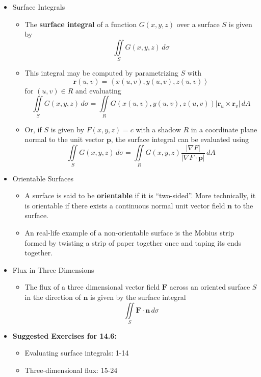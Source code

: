 \documentclass[12pt]{article}
\theoremstyle{plain}
\theoremstyle{definition}
\theoremstyle{remark}
\newcommand{\vect}[1]{\mathbf{#1}}
\begin{document}
	\begin{itemize}
		
	\item Surface Integrals
	
		\begin{itemize}
		\item The \textbf{surface integral} of a function $G(x,y,z)$ over a surface $S$ is given by \[\iint\limits_S G(x,y,z)\,d\sigma\]
		
		\item This integral may be computed by parametrizing $S$ with \[\vect{r}(u,v)=\left<x(u,v),y(u,v),z(u,v)\right>\] for $(u,v)\in R$ and evaluating \[\iint\limits_S G(x,y,z)\,d\sigma = \iint\limits_R G(x(u,v),y(u,v),z(u,v)) |\vect{r}_u\times \vect{r}_v|\,dA \]
		
		\item Or, if $S$ is given by $F(x,y,z)=c$ with a shadow $R$ in a coordinate plane normal to the unit vector $\vect{p}$, the surface integral can be evaluated using \[\iint\limits_S G(x,y,z)\,d\sigma = \iint\limits_R G(x,y,z)\frac{|\nabla F|}{|\nabla F \cdot \vect{p}|}\,dA\]
		\end{itemize}
		
	\item Orientable Surfaces
		\begin{itemize}
		\item A surface is said to be \textbf{orientable} if it is ``two-sided''. More technically, it is orientable if there exists a continuous normal unit vector field $\vect{n}$ to the surface.
		\item An real-life example of a non-orientable surface is the Mobius strip formed by twisting a strip of paper together once and taping its ends together.
		\end{itemize}
		
	\item Flux in Three Dimensions
	
		\begin{itemize}
		\item The flux of a three dimensional vector field $\vect{F}$ across an oriented surface $S$ in the direction of $\vect{n}$ is given by the surface integral \[\iint\limits_S \vect{F}\cdot\vect{n}\,d\sigma\]
		\end{itemize}
				
	\item \textbf{Suggested Exercises for 14.6:}
	
		\begin{itemize}
		\item Evaluating surface integrals: 1-14
		\item Three-dimensional flux: 15-24
		\end{itemize}
		
	\end{itemize}
	
\end{document}
